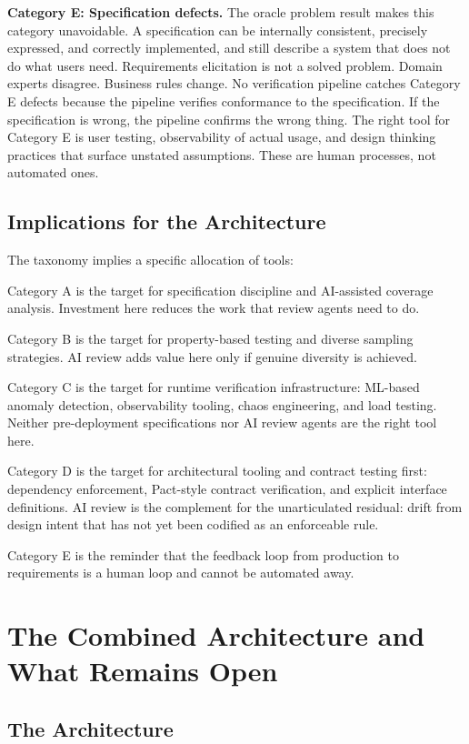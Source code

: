 \documentclass{article}
\begin{document}
\textbf{Category E: Specification defects.} The oracle problem result makes
this category unavoidable. A specification can be internally consistent,
precisely expressed, and correctly implemented, and still describe a
system that does not do what users need. Requirements elicitation is not
a solved problem. Domain experts disagree. Business rules change. No
verification pipeline catches Category E defects because the pipeline
verifies conformance to the specification. If the specification is wrong,
the pipeline confirms the wrong thing. The right tool for Category E is
user testing, observability of actual usage, and design thinking practices
that surface unstated assumptions. These are human processes, not
automated ones.

\subsection{Implications for the Architecture}

The taxonomy implies a specific allocation of tools:

Category A is the target for specification discipline and AI-assisted
coverage analysis. Investment here reduces the work that review agents
need to do.

Category B is the target for property-based testing and diverse sampling
strategies. AI review adds value here only if genuine diversity is
achieved.

Category C is the target for runtime verification infrastructure:
ML-based anomaly detection, observability tooling, chaos engineering, and
load testing. Neither pre-deployment specifications nor AI review agents
are the right tool here.

Category D is the target for architectural tooling and contract testing
first: dependency enforcement, Pact-style contract verification, and
explicit interface definitions. AI review is the complement for the
unarticulated residual: drift from design intent that has not yet been
codified as an enforceable rule.

Category E is the reminder that the feedback loop from production to
requirements is a human loop and cannot be automated away.


\section{The Combined Architecture and What Remains Open}

\subsection{The Architecture}
\end{document}
